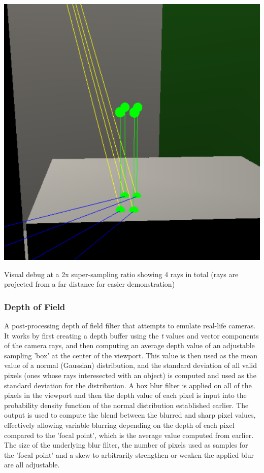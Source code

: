\documentclass{article}
\begin{document}
    \begin{center}
      \includegraphics[scale=0.55]{images/supersampling_debugger.png}

      Visual debug at a 2x super-sampling ratio showing 4 rays in total (rays are projected from a far 
      distance for easier demonstration)
    \end{center}

    \subsubsection{Depth of Field}
    A post-processing depth of field filter that attempts to emulate real-life cameras. It works by first
    creating a depth buffer using the \emph{t} values and vector components of the camera rays, and then 
    computing an average depth value of an adjustable sampling 'box' at the center of the viewport. This value 
    is then used as the mean value of a normal (Gaussian) distribution, and the standard deviation of all valid
    pixels (ones whose rays interesected with an object) is computed and used as the standard deviation for 
    the distribution. A box blur filter is applied on all of the pixels in the viewport and then the depth 
    value of each pixel is input into the probability density function of the normal distribution established 
    earlier. The output is used to compute the blend between the blurred and sharp pixel values, effectively 
    allowing variable blurring depending on the depth of each pixel compared to the 'focal point', which is 
    the average value computed from earlier. The size of the underlying blur filter, the number of pixels used 
    as samples for the 'focal point' and a skew to arbitrarily strengthen or weaken the applied blur are all adjustable.
\end{document}
